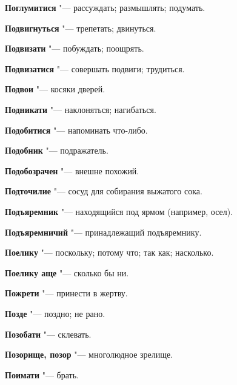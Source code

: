 \begin{mymulticols}{2}
\noindent\textbf{Поглумитися} "--- рассуждать; размышлять; подумать. 




\noindent\textbf{Подвигнуться} "--- трепетать; двинуться. 




\noindent\textbf{Подвизати} "--- побуждать; поощрять. 




\noindent\textbf{Подвизатися} "--- совершать подвиги; трудиться. 




\noindent\textbf{Подвои} "--- косяки дверей. 




\noindent\textbf{Подникати} "--- наклоняться; нагибаться. 




\noindent\textbf{Подобитися} "--- напоминать что-либо. 




\noindent\textbf{Подобник} "--- подражатель. 




\noindent\textbf{Подобозрачен} "--- внешне похожий. 




\noindent\textbf{Подточилие} "--- сосуд для собирания выжатого сока. 




\noindent\textbf{Подъяремник} "--- находящийся под ярмом (например, осел). 




\noindent\textbf{Подъяремничий} "--- принадлежащий подъяремнику. 




\noindent\textbf{Поелику} "--- поскольку; потому что; так как; насколько. 




\noindent\textbf{Поелику аще} "--- сколько бы ни. 




\noindent\textbf{Пожрети} "--- принести в жертву. 




\noindent\textbf{Позде} "--- поздно; не рано. 




\noindent\textbf{Позобати} "--- склевать. 




\noindent\textbf{Позорище, позор} "--- многолюдное зрелище. 




\noindent\textbf{Поимати} "--- брать. 





\end{mymulticols}
